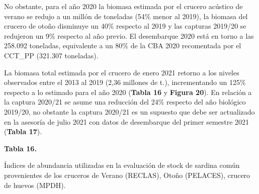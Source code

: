\documentclass[
  spanish,
]{article}
\begin{document}
No obstante, para el año 2020 la biomasa estimada por el crucero
acústico de verano se redujo a un millón de toneladas (54\% menor al
2019), la biomasa del crucero de otoño disminuye un 40\% respecto al
2019 y las capturas 2019/20 se redujeron un 9\% respecto al año previo.
El desembarque 2020 está en torno a las 258.092 toneladas, equivalente a
un 80\% de la CBA 2020 recomentada por el CCT\_PP (321.307 toneladas).

La biomasa total estimada por el crucero de enero 2021 retorno a los
niveles observados entre el 2013 al 2019 (2,36 millones de t.),
incrementando un 125\% respecto a lo estimado para el año 2020
(\textbf{Tabla 16} y \textbf{Figura 20}). En relación a la captura
2020/21 se asume una reducción del 24\% respecto del año biológico
2019/20, no obstante la captura 2020/21 es un supuesto que debe ser
actualizado en la asesoría de julio 2021 con datos de desembarque del
primer semestre 2021 (\textbf{Tabla 17}).

\pagebreak

\small
\begin{center} 
\textbf{Tabla 16.}
\end{center}
\begin{center} 
\vspace{-0.2cm} Índices de abundancia utilizadas en la evaluación de stock de sardina común provenientes de los cruceros de Verano (RECLAS), Otoño (PELACES), crucero de huevos (MPDH).
\end{center}
\vspace{-0.2cm}
\end{document}
